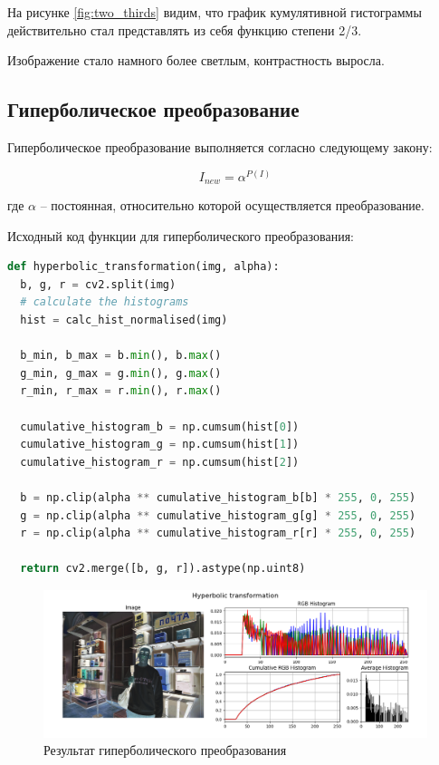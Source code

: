 На рисунке \ref{fig:two_thirds} видим, что график кумулятивной гистограммы действительно стал представлять из себя функцию степени 2/3. 

Изображение стало намного более светлым, контрастность выросла. 

\subsection{Гиперболическое преобразование}  

Гиперболическое преобразование выполняется согласно следующему закону:

\begin{equation}
  I_{new} = \alpha^{P(I)}
\end{equation}

где $\alpha$ -- постоянная, относительно которой осуществляется преобразование.

Исходный код функции для гиперболического преобразования:

\begin{lstlisting}[language=Python]
def hyperbolic_transformation(img, alpha):
  b, g, r = cv2.split(img)
  # calculate the histograms
  hist = calc_hist_normalised(img)

  b_min, b_max = b.min(), b.max()
  g_min, g_max = g.min(), g.max()
  r_min, r_max = r.min(), r.max()

  cumulative_histogram_b = np.cumsum(hist[0]) 
  cumulative_histogram_g = np.cumsum(hist[1])
  cumulative_histogram_r = np.cumsum(hist[2])

  b = np.clip(alpha ** cumulative_histogram_b[b] * 255, 0, 255)
  g = np.clip(alpha ** cumulative_histogram_g[g] * 255, 0, 255)
  r = np.clip(alpha ** cumulative_histogram_r[r] * 255, 0, 255)
  
  return cv2.merge([b, g, r]).astype(np.uint8)
\end{lstlisting}

\begin{figure}[H]
    \centering
    \includegraphics[width=\textwidth]{../results/Hyperbolic transformation.png}
    \caption{Результат гиперболического преобразования}
    \label{fig:hyperbolic}
\end{figure}

